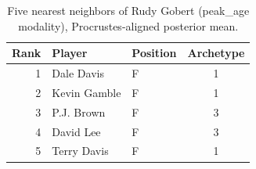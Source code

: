 \begin{table}[htbp]
  \centering\small
  \begin{tabular}{rllc}
    \toprule
    Rank & Player & Position & Archetype \\
    \midrule
    1 & Dale Davis & F & 1 \\
    2 & Kevin Gamble & F & 1 \\
    3 & P.J. Brown & F & 3 \\
    4 & David Lee & F & 3 \\
    5 & Terry Davis & F & 1 \\
    \bottomrule
  \end{tabular}
  \caption{Five nearest neighbors of Rudy Gobert (peak_age modality), Procrustes-aligned posterior mean.}
  \label{tab:Rudy_Gobert_neighbors_peak_age}
\end{table}

